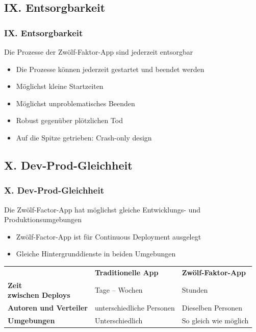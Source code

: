 \documentclass{beamer}
\begin{document}
			\subsection{IX. Entsorgbarkeit}
			\begin{frame}
				\frametitle{IX. Entsorgbarkeit}
				\begin{block}{Die Prozesse der Zwölf-Faktor-App sind jederzeit entsorgbar}
					\begin{itemize}
						\item Die Prozesse können jederzeit gestartet und beendet werden
						\item Möglichst kleine Startzeiten
						\item Möglichst unproblematisches Beenden
						\item Robust gegenüber plötzlichen Tod
						\item Auf die Spitze getrieben: Crash-only design
					\end{itemize}
				\end{block}
			
			\end{frame}
			\subsection{X. Dev-Prod-Gleichheit}
				\begin{frame}
					\frametitle{X. Dev-Prod-Gleichheit}
					\begin{block}{Die Zwölf-Factor-App hat möglichst gleiche Entwicklungs- und Produktionsumgebungen}
						\begin{itemize}
							\item Zwölf-Factor-App ist für Continuous Deployment ausgelegt
							\item Gleiche Hintergrunddienste in beiden Umgebungen
						\end{itemize}
					\end{block}
					{\small
					\begin{tabular}{C{3cm}C{3cm}C{3cm}}
						& \textbf{Traditionelle App} & \textbf{Zwölf-Faktor-App} \\
						\textbf{Zeit \newline zwischen Deploys} & Tage -- Wochen & Stunden \\
						\textbf{Autoren und Verteiler} & unterschiedliche Personen & Dieselben Personen \\
						\textbf{Umgebungen} & Unterschiedlich & So gleich wie möglich
					\end{tabular}
					}
				
				\end{frame}
\end{document}
